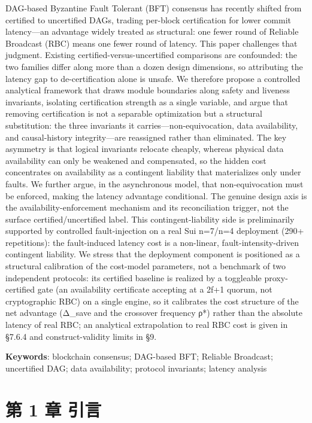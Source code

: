 \documentclass[UTF8,fontset=windows,a4paper,11pt]{ctexart}
\begin{document}
DAG-based Byzantine Fault Tolerant (BFT) consensus has recently shifted
from certified to uncertified DAGs, trading per-block certification for
lower commit latency---an advantage widely treated as structural: one
fewer round of Reliable Broadcast (RBC) means one fewer round of
latency. This paper challenges that judgment. Existing
certified-versus-uncertified comparisons are confounded: the two
families differ along more than a dozen design dimensions, so
attributing the latency gap to de-certification alone is unsafe. We
therefore propose a controlled analytical framework that draws module
boundaries along safety and liveness invariants, isolating certification
strength as a single variable, and argue that removing certification is
not a separable optimization but a structural substitution: the three
invariants it carries---non-equivocation, data availability, and
causal-history integrity---are reassigned rather than eliminated. The
key asymmetry is that logical invariants relocate cheaply, whereas
physical data availability can only be weakened and compensated, so the
hidden cost concentrates on availability as a contingent liability that
materializes only under faults. We further argue, in the asynchronous
model, that non-equivocation must be enforced, making the latency
advantage conditional. The genuine design axis is the
availability-enforcement mechanism and its reconciliation trigger, not
the surface certified/uncertified label. This contingent-liability side
is preliminarily supported by controlled fault-injection on a real Sui
n=7/n=4 deployment (290+ repetitions): the fault-induced latency cost is
a non-linear, fault-intensity-driven contingent liability. We stress
that the deployment component is positioned as a structural calibration
of the cost-model parameters, not a benchmark of two independent
protocols: its certified baseline is realized by a toggleable
proxy-certified gate (an availability certificate accepting at a 2f+1
quorum, not cryptographic RBC) on a single engine, so it calibrates the
cost structure of the net advantage (Δ\_save and the crossover frequency
ρ*) rather than the absolute latency of real RBC; an analytical
extrapolation to real RBC cost is given in §7.6.4 and construct-validity
limits in §9.

\textbf{Keywords}: blockchain consensus; DAG-based BFT; Reliable
Broadcast; uncertified DAG; data availability; protocol invariants;
latency analysis

\section{第 1 章 引言}\label{ux7b2c-1-ux7ae0-ux5f15ux8a00}
\end{document}
